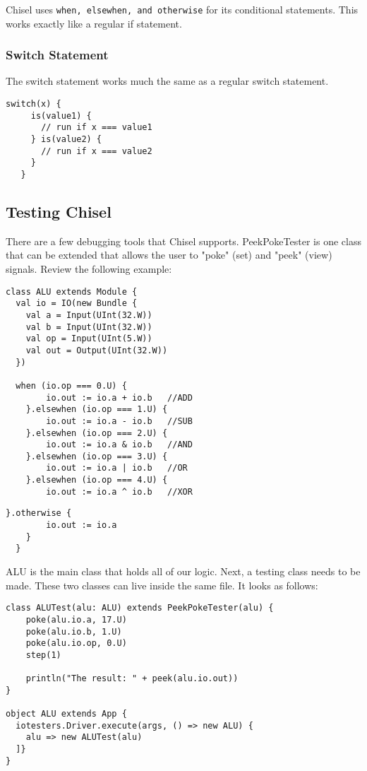 \documentclass[12pt, letterpaper]{report}
\begin{document}
Chisel uses \verb|when, elsewhen, and otherwise| for its conditional statements.
This works exactly like a regular if statement.

\subsubsection{Switch Statement}
The switch statement works much the same as a regular switch statement.
\begin{lstlisting}[style=scala]
   switch(x) {
     is(value1) {
       // run if x === value1
     } is(value2) {
       // run if x === value2
     }
   }
\end{lstlisting}

\subsection{Testing Chisel}
There are a few debugging tools that Chisel supports.
PeekPokeTester is one class that can be extended that allows the user to "poke" (set) and "peek" (view) signals.
Review the following example:

\begin{lstlisting}[style=scala]
class ALU extends Module {
  val io = IO(new Bundle {
    val a = Input(UInt(32.W))
    val b = Input(UInt(32.W))
    val op = Input(UInt(5.W))
    val out = Output(UInt(32.W))
  })
  
  when (io.op === 0.U) {
        io.out := io.a + io.b   //ADD
    }.elsewhen (io.op === 1.U) {
        io.out := io.a - io.b   //SUB
    }.elsewhen (io.op === 2.U) {
        io.out := io.a & io.b   //AND
    }.elsewhen (io.op === 3.U) {
        io.out := io.a | io.b   //OR
    }.elsewhen (io.op === 4.U) {
        io.out := io.a ^ io.b   //XOR
\end{lstlisting}
\begin{lstlisting}[style=scala]
    }.otherwise {
        io.out := io.a
    }
  }
\end{lstlisting}

\noindent ALU is the main class that holds all of our logic. 
Next, a testing class needs to be made. These two classes can live inside the same file. It looks as follows:

\begin{lstlisting}[style=scala]
 class ALUTest(alu: ALU) extends PeekPokeTester(alu) {
    poke(alu.io.a, 17.U)
    poke(alu.io.b, 1.U)
    poke(alu.io.op, 0.U)
    step(1)

    println("The result: " + peek(alu.io.out))
}

object ALU extends App {
  iotesters.Driver.execute(args, () => new ALU) {
    alu => new ALUTest(alu)
  ]}
}
\end{lstlisting}
\end{document}
